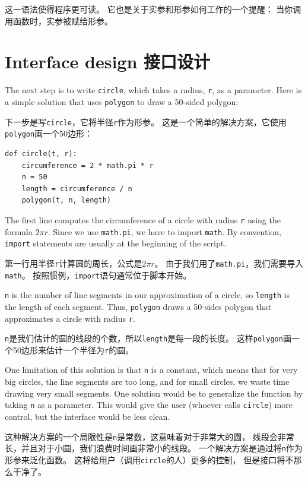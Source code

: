 \documentclass[10pt]{book}
\begin{document}
\begin{CJK}{UTF8}{gbsn}
这一语法使得程序更可读。
它也是关于实参和形参如何工作的一个提醒：
当你调用函数时，实参被赋给形参。


\section{Interface design 接口设计}

The next step is to write {\tt circle}, which takes a radius,
{\tt r}, as a parameter.  Here is a simple solution that uses
{\tt polygon} to draw a 50-sided polygon:

下一步是写{\tt circle}，它将半径{\tt r}作为形参。
这是一个简单的解决方案，它使用{\tt polygon}画一个50边形：

\begin{verbatim}
def circle(t, r):
    circumference = 2 * math.pi * r
    n = 50
    length = circumference / n
    polygon(t, n, length)
\end{verbatim}
%
The first line computes the circumference of a circle with radius
{\tt r} using the formula $2 \pi r$.  Since we use {\tt math.pi}, we
have to import {\tt math}.  By convention, {\tt import} statements
are usually at the beginning of the script.

第一行用半径{\tt r}计算圆的周长，公式是$2 \pi r$。
由于我们用了{\tt math.pi}，我们需要导入{\tt math}。
按照惯例，{\tt import}语句通常位于脚本开始。

{\tt n} is the number of line segments in our approximation of a circle,
so {\tt length} is the length of each segment.  Thus, {\tt polygon}
draws a 50-sides polygon that approximates a circle with radius {\tt r}.

{\tt n}是我们估计的圆的线段的个数，所以{\tt length}是每一段的长度。
这样{\tt polygon}画一个50边形来估计一个半径为{\tt r}的圆。

One limitation of this solution is that {\tt n} is a constant, which
means that for very big circles, the line segments are too long, and
for small circles, we waste time drawing very small segments.  One
solution would be to generalize the function by taking {\tt n} as
a parameter.  This would give the user (whoever calls {\tt circle})
more control, but the interface would be less clean.

这种解决方案的一个局限性是{\tt n}是常数，这意味着对于非常大的圆，
线段会非常长，并且对于小圆，我们浪费时间画非常小的线段。
一个解决方案是通过将{\tt n}作为形参来泛化函数。
这将给用户（调用{\tt circle}的人）更多的控制，
但是接口将不那么干净了。


\end{CJK}
\end{document}
